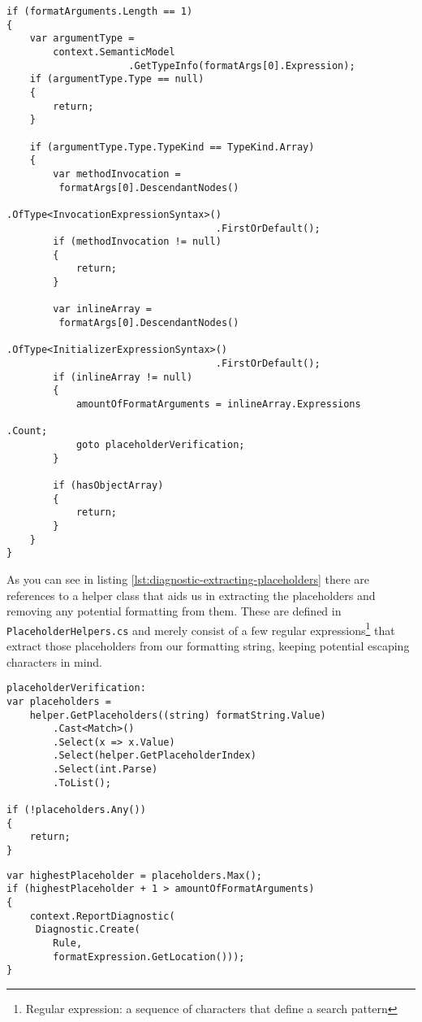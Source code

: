 \begin{minipage}{\linewidth}
\begin{lstlisting}[label={lst:diagnostic-verifying-inline-array-initialization}]
if (formatArguments.Length == 1)
{
	var argumentType = 
		context.SemanticModel
					 .GetTypeInfo(formatArgs[0].Expression);
	if (argumentType.Type == null)
	{
		return;
	}

	if (argumentType.Type.TypeKind == TypeKind.Array)
	{
		var methodInvocation = 
		 formatArgs[0].DescendantNodes()
									.OfType<InvocationExpressionSyntax>()
									.FirstOrDefault();
		if (methodInvocation != null)
		{
			return;
		}

		var inlineArray = 
		 formatArgs[0].DescendantNodes()
									.OfType<InitializerExpressionSyntax>()
									.FirstOrDefault();
		if (inlineArray != null)
		{
			amountOfFormatArguments = inlineArray.Expressions
																				   .Count;
			goto placeholderVerification;
		}

		if (hasObjectArray)
		{
			return;
		}
	}
}
\end{lstlisting}
\end{minipage}

\begin{minipage}{\linewidth}
As you can see in listing \ref{lst:diagnostic-extracting-placeholders} there are references to a helper class that aids us in extracting the placeholders and removing any potential formatting from them. These are defined in \texttt{PlaceholderHelpers.cs} and merely consist of a few regular expressions\footnote{Regular expression: a sequence of characters that define a search pattern} that extract those placeholders from our formatting string, keeping potential escaping characters in mind.

\begin{lstlisting}[label={lst:diagnostic-extracting-placeholders}]
placeholderVerification:
var placeholders = 
	helper.GetPlaceholders((string) formatString.Value)
        .Cast<Match>()
        .Select(x => x.Value)
        .Select(helper.GetPlaceholderIndex)
        .Select(int.Parse)
        .ToList();

if (!placeholders.Any())
{
	return;
}
\end{lstlisting}

\begin{lstlisting}[label={lst:diagnostic-compare-placeholder-index}]
var highestPlaceholder = placeholders.Max();
if (highestPlaceholder + 1 > amountOfFormatArguments)
{
	context.ReportDiagnostic(
	 Diagnostic.Create(
		Rule, 
		formatExpression.GetLocation()));
}
\end{lstlisting}
\end{minipage}

